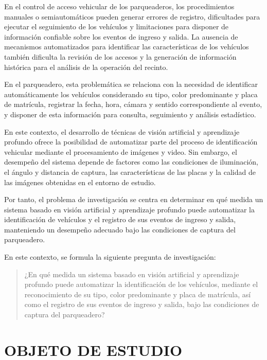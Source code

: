 En el control de acceso vehicular de los parqueaderos, los procedimientos
manuales o semiautomáticos pueden generar errores de registro, dificultades para
ejecutar el seguimiento de los vehículos y limitaciones para disponer de
información confiable sobre los eventos de ingreso y salida. La ausencia de
mecanismos automatizados para identificar las características de los vehículos
también dificulta la revisión de los accesos y la generación de información
histórica para el análisis de la operación del recinto.

En el parqueadero, esta problemática se relaciona con la necesidad de
identificar automáticamente los vehículos considerando su tipo, color
predominante y placa de matrícula, registrar la fecha, hora, cámara y sentido
correspondiente al evento, y disponer de esta información para consulta,
seguimiento y análisis estadístico.

En este contexto, el desarrollo de técnicas de visión artificial y aprendizaje
profundo ofrece la posibilidad de automatizar parte del proceso de identificación
vehicular mediante el procesamiento de imágenes y video. Sin embargo, el
desempeño del sistema depende de factores como las condiciones de iluminación,
el ángulo y distancia de captura, las características de las placas y la calidad
de las imágenes obtenidas en el entorno de estudio.

Por tanto, el problema de investigación se centra en determinar en qué medida un
sistema basado en visión artificial y aprendizaje profundo puede automatizar la
identificación de vehículos y el registro de sus eventos de ingreso y salida,
manteniendo un desempeño adecuado bajo las condiciones de captura del parqueadero.

En este contexto, se formula la siguiente pregunta de investigación:
\begin{quote}
    ¿En qué medida un sistema basado en visión artificial y aprendizaje profundo
    puede automatizar la identificación de los vehículos, mediante el
    reconocimiento de su tipo, color predominante y placa de matrícula, así como
    el registro de sus eventos de ingreso y salida, bajo las condiciones de
    captura del parqueadero?
\end{quote}

\section*{OBJETO DE ESTUDIO}

